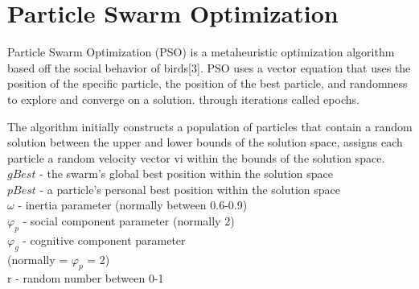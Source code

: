 \documentclass[twocolumn]{article}
\begin{document}
\section{Particle Swarm Optimization}

Particle Swarm Optimization (PSO) is a metaheuristic optimization algorithm based off the social behavior of birds[3]. PSO uses a vector equation that uses the position of the specific particle, the position of the best particle, and randomness to explore and converge on a solution. through iterations called epochs.


The algorithm initially constructs a population of particles that contain a random solution between the upper and lower bounds of the solution space, assigns each particle a random velocity vector vi within the bounds of the solution space.\\


\textbf{$gBest$} - the swarm’s global best position within the solution space\\

\textbf{$pBest$} - a particle’s personal best position within the solution space \\

\textbf{$\omega$} - inertia parameter (normally between 0.6-0.9)\\

\textbf{$\varphi _p$} - social component parameter (normally 2)\\

\textbf{$\varphi _g$} - cognitive component parameter \\(normally = $\varphi _p$ = 2)\\

r - random number between 0-1\\
\end{document}
